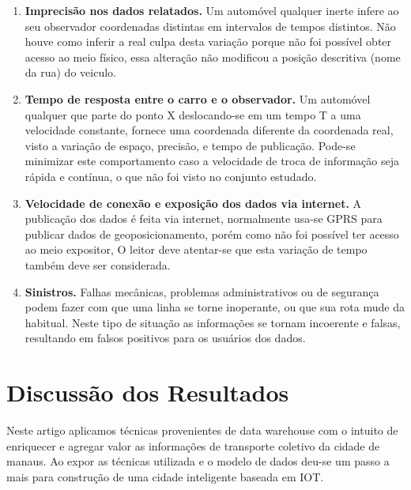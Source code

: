 \documentclass[12pt]{article}
\begin{document}
\begin{enumerate}
\item \textbf{Imprecisão nos dados relatados.} Um automóvel qualquer inerte infere ao seu observador coordenadas distintas em intervalos de tempos distintos. Não houve como inferir a real culpa desta variação porque não foi possível obter acesso ao meio físico, essa alteração não modificou a posição descritiva (nome da rua) do veiculo.\\

\item \textbf{Tempo de resposta entre o carro e o observador.} 
Um automóvel qualquer que parte do ponto X deslocando-se em um tempo T a uma velocidade constante, fornece uma coordenada diferente da coordenada real, visto a variação de espaço, precisão, e tempo de publicação. Pode-se minimizar este comportamento caso a velocidade de troca de informação seja rápida e contínua, o que não foi visto no conjunto estudado. \\

\item \textbf{Velocidade de conexão e exposição dos dados via internet.} A publicação dos dados é feita via internet, normalmente usa-se GPRS para publicar dados de geoposicionamento, porém como não foi possível ter acesso ao meio expositor, O leitor deve atentar-se que esta variação de tempo também deve ser considerada.\\

\item \textbf{Sinistros.} Falhas mecânicas, problemas administrativos ou de segurança podem fazer com que uma linha se torne inoperante, ou que sua rota mude da habitual. Neste tipo de situação as informações se tornam incoerente e falsas, resultando em falsos positivos para os usuários dos dados.\\
\end{enumerate}

\section{Discussão dos Resultados}
Neste artigo aplicamos técnicas provenientes de data warehouse com o intuito de enriquecer e agregar valor as informações de transporte coletivo da cidade de manaus. Ao expor as técnicas utilizada e o modelo de dados deu-se um passo a mais para construção de uma cidade inteligente baseada em IOT.
\end{document}
